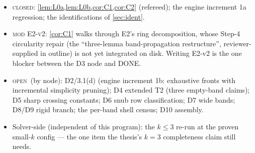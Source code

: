 \documentclass[11pt,a4paper,oneside]{article}
\theoremstyle{plain}
\theoremstyle{remark}
\newcommand{\statDONE}{\textcolor{green!50!black}{\textsc{closed}}}
\newcommand{\statOPEN}{\textcolor{red!60!black}{\textsc{open}}}
\newcommand{\statCOND}[1]{\textcolor{orange!70!black}{\textsc{mod #1}}}
\begin{document}
\begin{itemize}[leftmargin=2em,itemsep=2pt]
\item \statDONE: \cref{lem:L0a,lem:L0b,cor:C1,cor:C2} (refereed); the engine increment 1a
  regression; the identifications of \cref{sec:ident}.
\item \statCOND{E2-v2}: \cref{cor:C1} walks through E2's ring decomposition, whose Step-4
  circularity repair (the ``three-lemma band-propagation restructure'', reviewer-supplied
  in outline) is not yet integrated on disk. Writing E2-v2 is the one blocker between the
  D3 node and DONE.
\item \statOPEN\ (by node): D2/3.1(d) (engine increment 1b: exhaustive fronts with
  incremental simplicity pruning); D4 extended T2 (three empty-band claims); D5 sharp
  crossing constants; D6 snub row classification; D7 wide bands; D8/D9 rigid branch;
  the per-band shell census; D10 assembly.
\item Solver-side (independent of this program): the $k \le 3$ re-run at the proven
  small-$k$ config --- the one item the thesis's $k = 3$ completeness claim still needs.
\end{itemize}
\end{document}
